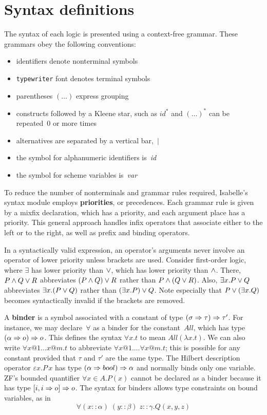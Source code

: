 
\chapter{Syntax definitions}
The syntax of each logic is presented using a context-free grammar.
These grammars obey the following conventions:
\begin{itemize}
\item identifiers denote nonterminal symbols
\item \texttt{typewriter} font denotes terminal symbols
\item parentheses $(\ldots)$ express grouping
\item constructs followed by a Kleene star, such as $id^*$ and $(\ldots)^*$
can be repeated~0 or more times 
\item alternatives are separated by a vertical bar,~$|$
\item the symbol for alphanumeric identifiers is~{\it id\/} 
\item the symbol for scheme variables is~{\it var}
\end{itemize}
To reduce the number of nonterminals and grammar rules required, Isabelle's
syntax module employs {\bf priorities}, or precedences.
Each grammar rule is given by a mixfix declaration, which has a priority,
and each argument place has a priority.  This general approach handles
infix operators that associate either to the left or to the right, as well
as prefix and binding operators.

In a syntactically valid expression, an operator's arguments never involve
an operator of lower priority unless brackets are used.  Consider
first-order logic, where $\exists$ has lower priority than $\vee$,
which has lower priority than $\wedge$.  There, $P\wedge Q \vee R$
abbreviates $(P\wedge Q) \vee R$ rather than $P\wedge (Q\vee R)$.  Also,
$\exists x.P\vee Q$ abbreviates $\exists x.(P\vee Q)$ rather than
$(\exists x.P)\vee Q$.  Note especially that $P\vee(\exists x.Q)$
becomes syntactically invalid if the brackets are removed.

A {\bf binder} is a symbol associated with a constant of type
$(\sigma\Rightarrow\tau)\Rightarrow\tau'$.  For instance, we may declare~$\forall$ as a binder
for the constant~$All$, which has type $(\alpha\Rightarrow o)\Rightarrow o$.  This defines the
syntax $\forall x.t$ to mean $All(\lambda x.t)$.  We can also write $\forall
x@1\ldots x@m.t$ to abbreviate $\forall x@1.  \ldots \forall x@m.t$; this is
possible for any constant provided that $\tau$ and $\tau'$ are the same type.
The Hilbert description operator $\varepsilon x.P\,x$ has type $(\alpha\Rightarrow
bool)\Rightarrow\alpha$ and normally binds only one variable.  
ZF's bounded quantifier $\forall x\in A.P(x)$ cannot be declared as a
binder because it has type $[i, i\Rightarrow o]\Rightarrow o$.  The syntax for binders allows
type constraints on bound variables, as in
\[ \forall (x{::}\alpha) \; (y{::}\beta) \; z{::}\gamma. Q(x,y,z) \]

